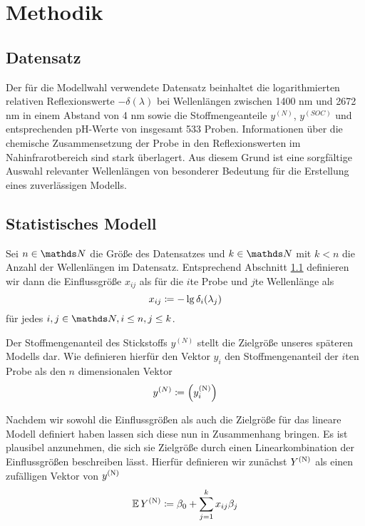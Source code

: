 \section{Methodik}
\label{sec:Methodik}
	
	\subsection{Datensatz}
	\label{ssec:Datensatz}
	
	    Der für die Modellwahl verwendete Datensatz beinhaltet die logarithmierten relativen Reflexionswerte $-\delta(\lambda)$ bei Wellenlängen zwischen 1400 nm und 2672 nm in einem Abstand von 4 nm sowie die Stoffmengeanteile $y^{(N)}$, $y^{(SOC)}$ und entsprechenden pH-Werte von insgesamt 533 Proben.
	    Informationen über die chemische Zusammensetzung der Probe in den Reflexionswerten im Nahinfrarotbereich sind stark überlagert. \cite{Agelet2010} 
	    Aus diesem Grund ist eine sorgfältige Auswahl relevanter Wellenlängen von besonderer Bedeutung für die Erstellung eines zuverlässigen Modells. 
	    
	

	\subsection{Statistisches Modell}
	\label{ssec:Statistisches Modell}
	
	    Sei $n\in\SN$ die Größe des Datensatzes und $k\in\SN$ mit $k< n$ die Anzahl der Wellenlängen im Datensatz. 
	    Entsprechend Abschnitt \ref{ssec:Datensatz} definieren wir dann die Einflussgröße $x_{ij}$ als für die $i$te Probe und $j$te Wellenlänge als
	    \[
			x_{ij} \coloneqq -\lg \delta_i(\lambda_j)
		\]
		für jedes $i,j\in\SN,i\leq n,j\leq k$.
	    
	    Der Stoffmengenanteil des Stickstoffs  $y^{(N)}$ stellt die Zielgröße unseres späteren Modells dar.
	    Wie definieren hierfür den Vektor $y_i$ den Stoffmengenanteil der $i$ten Probe als den $n$ dimensionalen Vektor
		\[
			 y^{(N)} \coloneqq \left( y^{\mathrm{(N)}}_i \right)
		\]

        Nachdem wir sowohl die Einflussgrößen als auch die Zielgröße für das lineare Modell definiert haben lassen sich diese nun in Zusammenhang bringen.
        Es ist plausibel anzunehmen, die sich sie Zielgröße durch einen Linearkombination der Einflussgrößen beschreiben lässt.
        Hierfür definieren wir zunächst $Y^{\mathrm{(N)}}$ als einen zufälligen Vektor von $y^{\mathrm{(N)}}$
        \[ 
			 \operatorname{\mathbb{E}} Y^{\mathrm{(N)}} \coloneqq \beta_0 + \sum_{j=1}^k{x_{ij}\beta_j} 
		\]
		
